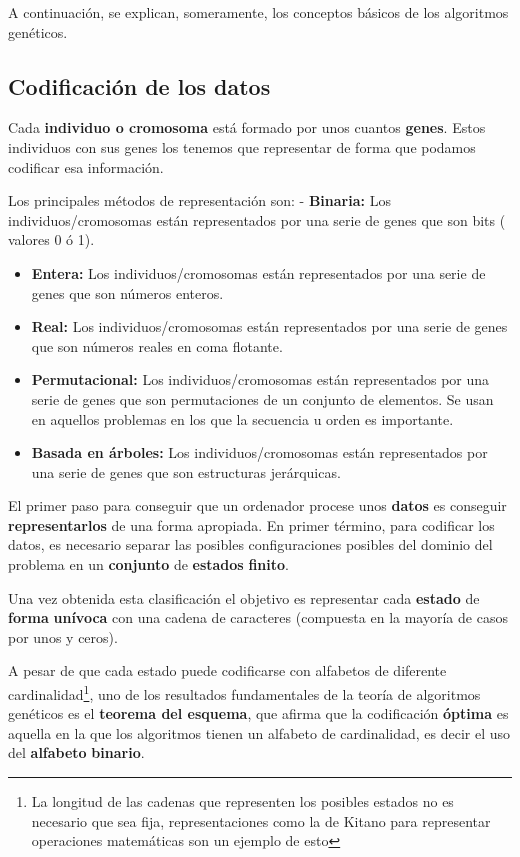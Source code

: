 \documentclass[
  a4paper,
  DIV=11,
  numbers=noendperiod]{scrreprt}
\begin{document}
A continuación, se explican, someramente, los conceptos básicos de los
algoritmos genéticos.

\hypertarget{codificaciuxf3n-de-los-datos}{%
\subsection{Codificación de los
datos}\label{codificaciuxf3n-de-los-datos}}

Cada \textbf{individuo o cromosoma} está formado por unos cuantos
\textbf{genes}. Estos individuos con sus genes los tenemos que
representar de forma que podamos codificar esa información.

Los principales métodos de representación son: - \textbf{Binaria:} Los
individuos/cromosomas están representados por una serie de genes que son
bits ( valores 0 ó 1).

\begin{itemize}
\item
  \textbf{Entera:} Los individuos/cromosomas están representados por una
  serie de genes que son números enteros.
\item
  \textbf{Real:} Los individuos/cromosomas están representados por una
  serie de genes que son números reales en coma flotante.
\item
  \textbf{Permutacional:} Los individuos/cromosomas están representados
  por una serie de genes que son permutaciones de un conjunto de
  elementos. Se usan en aquellos problemas en los que la secuencia u
  orden es importante.
\item
  \textbf{Basada en árboles:} Los individuos/cromosomas están
  representados por una serie de genes que son estructuras jerárquicas.
\end{itemize}

El primer paso para conseguir que un ordenador procese unos
\textbf{datos} es conseguir \textbf{representarlos} de una forma
apropiada. En primer término, para codificar los datos, es necesario
separar las posibles configuraciones posibles del dominio del problema
en un \textbf{conjunto} de \textbf{estados} \textbf{finito}.

Una vez obtenida esta clasificación el objetivo es representar cada
\textbf{estado} de \textbf{forma} \textbf{unívoca} con una cadena de
caracteres (compuesta en la mayoría de casos por unos y ceros).

A pesar de que cada estado puede codificarse con alfabetos de diferente
cardinalidad\footnote{La longitud de las cadenas que representen los
  posibles estados no es necesario que sea fija, representaciones como
  la de Kitano para representar operaciones matemáticas son un ejemplo
  de esto}, uno de los resultados fundamentales de la teoría de
algoritmos genéticos es el \textbf{teorema del esquema}, que afirma que
la codificación \textbf{óptima} es aquella en la que los algoritmos
tienen un alfabeto de cardinalidad, es decir el uso del
\textbf{alfabeto} \textbf{binario}.
\end{document}

